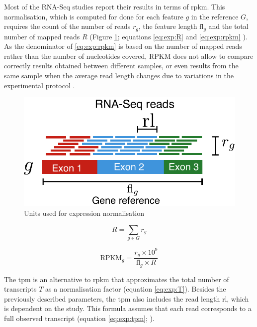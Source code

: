 Most of the RNA-Seq studies report their results in terms of \acrshort{rpkm}. 
This normalisation, which is computed for done for each feature $g$ in the reference $G$, requires the count of the number of reads  $r_{g}$, the feature length $\textrm{fl}_{g}$ and the total number of mapped reads $R$ (Figure \ref{fig:exp:units}; equations \ref{eq:exp:R} and  \ref{eq:exp:rpkm} \citealt{Mortazavi2008}).
As the denominator of \ref{eq:exp:rpkm} is based on the number of mapped reads rather than the number of nucleotides covered, RPKM does not allow to compare correctly results obtained between different samples, or even results from the same sample when the average read length changes due to variations in the experimental protocol \citealt{Wagner2012}.

\begin{figure}
\includegraphics[width=1\textwidth]{expVIP/Figures/Units.pdf}
\caption[Units used for expression normalisation]{Units used for expression normalisation}
\label{fig:exp:units}
\end{figure} 


\begin{equation}
\label{eq:exp:R}
R = \displaystyle\sum_{g \in G} r_{g} 
\end{equation}

\begin{equation}
\label{eq:exp:rpkm}
  \textrm{RPKM}_{g} = \frac{r_{g}\times10^9}{\textrm{fl}_{g}\times R}
\end{equation}

The \acrshort{tpm} is an alternative to \acrshort{rpkm} that approximates the total number of transcripts $T$ as a normalisation factor (equation \ref{eq:exp:T}). 
Besides the previously described parameters, the \acrshort{tpm} also includes the read length $\textrm{rl}$, which is dependent on the study. 
This formula assumes that each read corresponds to a full observed transcript (equation \ref{eq:exp:tpm}; \citealt{Wagner2012}). 

